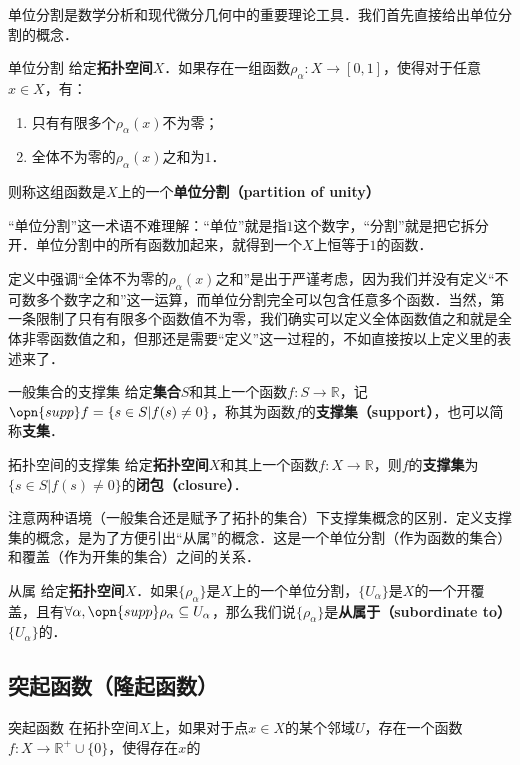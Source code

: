 

单位分割是数学分析和现代微分几何中的重要理论工具．我们首先直接给出单位分割的概念．

\begin{definition}{单位分割}
给定\textbf{拓扑空间}$X$．如果存在一组函数$\rho_\alpha: X \to [0, 1]$，使得对于任意$x\in X$，有：
\begin{enumerate}
\item 只有有限多个$\rho_\alpha(x)$不为零；
\item 全体不为零的$\rho_\alpha(x)$之和为$1$．
\end{enumerate}
则称这组函数是$X$上的一个\textbf{单位分割（partition of unity）}
\end{definition}

“单位分割”这一术语不难理解：“单位”就是指$1$这个数字，“分割”就是把它拆分开．单位分割中的所有函数加起来，就得到一个$X$上恒等于$1$的函数．

定义中强调“全体不为零的$\rho_\alpha(x)$之和”是出于严谨考虑，因为我们并没有定义“不可数多个数字之和”这一运算，而单位分割完全可以包含任意多个函数．当然，第一条限制了只有有限多个函数值不为零，我们确实可以定义全体函数值之和就是全体非零函数值之和，但那还是需要“定义”这一过程的，不如直接按以上定义里的表述来了．

\begin{definition}{一般集合的支撑集}
给定\textbf{集合}$S$和其上一个函数$f:S\to\mathbb{R}$，记$\opn{supp} f = \{s\in S| f(s)\not=0\}$，称其为函数$f$的\textbf{支撑集（support）}，也可以简称\textbf{支集}．
\end{definition}

\begin{definition}{拓扑空间的支撑集}
给定\textbf{拓扑空间}$X$和其上一个函数$f:X\to\mathbb{R}$，则$f$的\textbf{支撑集}为$\{s\in S| f(s)\not=0\}$的\textbf{闭包（closure）}．
\end{definition}

注意两种语境（一般集合还是赋予了拓扑的集合）下支撑集概念的区别．定义支撑集的概念，是为了方便引出“从属”的概念．这是一个单位分割（作为函数的集合）和覆盖（作为开集的集合）之间的关系．

\begin{definition}{从属}
给定\textbf{拓扑空间}$X$．如果$\{\rho_\alpha\}$是$X$上的一个单位分割，$\{U_\alpha\}$是$X$的一个开覆盖，且有$\forall \alpha, \opn{supp}\rho_\alpha\subseteq U_\alpha$，那么我们说$\{\rho_\alpha\}$是\textbf{从属于（subordinate to）}$\{U_\alpha\}$的．
\end{definition}

\subsection{突起函数（隆起函数）}

\begin{definition}{突起函数}
在拓扑空间$X$上，如果对于点$x\in X$的某个邻域$U$，存在一个函数$f:X\to\mathbb{R}^+\cup\{0\}$，使得存在$x$的
\end{definition}





